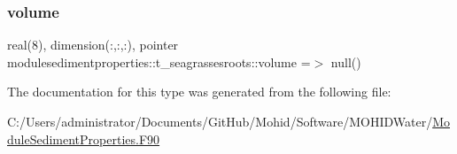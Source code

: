 \mbox{\label{structmodulesedimentproperties_1_1t__seagrassesroots_ada3ba3070d4fb636bf2b025a20cd4f2f}} 
\subsubsection{\texorpdfstring{volume}{volume}}
{\footnotesize\ttfamily real(8), dimension(\+:,\+:,\+:), pointer modulesedimentproperties\+::t\+\_\+seagrassesroots\+::volume =$>$ null()\hspace{0.3cm}{\ttfamily [private]}}



The documentation for this type was generated from the following file\+:\begin{DoxyCompactItemize}
\item 
C\+:/\+Users/administrator/\+Documents/\+Git\+Hub/\+Mohid/\+Software/\+M\+O\+H\+I\+D\+Water/\mbox{\hyperlink{_module_sediment_properties_8_f90}{Module\+Sediment\+Properties.\+F90}}\end{DoxyCompactItemize}
